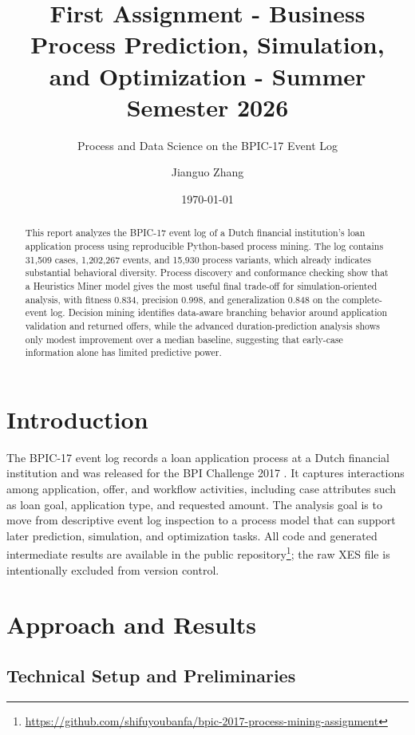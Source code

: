 \documentclass[
  english,
  font=times,
  twocolumn,
]{tumarticle}
\title{First Assignment - Business Process Prediction, Simulation, and Optimization - Summer Semester 2026}
\subtitle{Process and Data Science on the BPIC-17 Event Log}
\author[email=15500841929.zhang@tum.de]{Jianguo Zhang}
\date{\today}
\begin{document}
\maketitle

\begin{abstract}
This report analyzes the BPIC-17 event log of a Dutch financial institution's loan application process using reproducible Python-based process mining.
The log contains 31,509 cases, 1,202,267 events, and 15,930 process variants, which already indicates substantial behavioral diversity.
Process discovery and conformance checking show that a Heuristics Miner model gives the most useful final trade-off for simulation-oriented analysis, with fitness 0.834, precision 0.998, and generalization 0.848 on the complete-event log.
Decision mining identifies data-aware branching behavior around application validation and returned offers, while the advanced duration-prediction analysis shows only modest improvement over a median baseline, suggesting that early-case information alone has limited predictive power.
\end{abstract}

\section{Introduction}

The BPIC-17 event log records a loan application process at a Dutch financial institution and was released for the BPI Challenge 2017 \cite{bpichallenge2017}.
It captures interactions among application, offer, and workflow activities, including case attributes such as loan goal, application type, and requested amount.
The analysis goal is to move from descriptive event log inspection to a process model that can support later prediction, simulation, and optimization tasks.
All code and generated intermediate results are available in the public repository\footnote{\url{https://github.com/shifuyoubanfa/bpic-2017-process-mining-assignment}}; the raw XES file is intentionally excluded from version control.

\section{Approach and Results}

\subsection{Technical Setup and Preliminaries}
\end{document}
